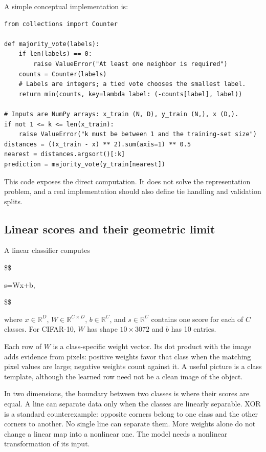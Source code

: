 A simple conceptual implementation is:

\begin{verbatim}
from collections import Counter

def majority_vote(labels):
    if len(labels) == 0:
        raise ValueError("At least one neighbor is required")
    counts = Counter(labels)
    # Labels are integers; a tied vote chooses the smallest label.
    return min(counts, key=lambda label: (-counts[label], label))

# Inputs are NumPy arrays: x_train (N, D), y_train (N,), x (D,).
if not 1 <= k <= len(x_train):
    raise ValueError("k must be between 1 and the training-set size")
distances = ((x_train - x) ** 2).sum(axis=1) ** 0.5
nearest = distances.argsort()[:k]
prediction = majority_vote(y_train[nearest])
\end{verbatim}

This code exposes the direct computation. It does not solve the representation problem, and a real implementation should also define tie handling and validation splits.

\subsection{Linear scores and their geometric limit}\label{04-visual-computing-ii-ch031-linear-scores-and-their-geometric-limit}

A linear classifier computes

\$\$

s=Wx+b,

\$\$

where \(x\in\mathbb{R}^{D}\), \(W\in\mathbb{R}^{C\times D}\), \(b\in\mathbb{R}^{C}\), and \(s\in\mathbb{R}^{C}\) contains one score for each of \(C\) classes. For CIFAR-10, \(W\) has shape \(10\times3072\) and \(b\) has 10 entries.

Each row of \(W\) is a class-specific weight vector. Its dot product with the image adds evidence from pixels: positive weights favor that class when the matching pixel values are large; negative weights count against it. A useful picture is a class template, although the learned row need not be a clean image of the object.

In two dimensions, the boundary between two classes is where their scores are equal. A line can separate data only when the classes are linearly separable. XOR is a standard counterexample: opposite corners belong to one class and the other corners to another. No single line can separate them. More weights alone do not change a linear map into a nonlinear one. The model needs a nonlinear transformation of its input.

